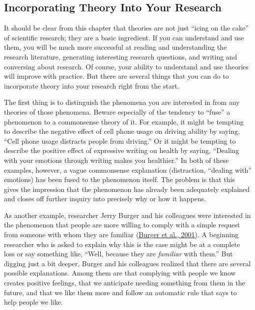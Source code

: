 \documentclass[
]{krantz}
\begin{document}
\hypertarget{incorporating-theory-into-your-research}{%
\subsection*{Incorporating Theory Into Your Research}\label{incorporating-theory-into-your-research}}


It should be clear from this chapter that theories are not just ``icing on the cake'' of scientific research; they are a basic ingredient. If you can understand and use them, you will be much more successful at reading and understanding the research literature, generating interesting research questions, and writing and conversing about research. Of course, your ability to understand and use theories will improve with practice. But there are several things that you can do to incorporate theory into your research right from the start.

The first thing is to distinguish the phenomena you are interested in from any theories of those phenomena. Beware especially of the tendency to ``fuse'' a phenomenon to a commonsense theory of it. For example, it might be tempting to describe the negative effect of cell phone usage on driving ability by saying, ``Cell phone usage distracts people from driving.'' Or it might be tempting to describe the positive effect of expressive writing on health by saying, ``Dealing with your emotions through writing makes you healthier.'' In both of these examples, however, a vague commonsense explanation (distraction, ``dealing with'' emotions) has been fused to the phenomenon itself. The problem is that this gives the impression that the phenomenon has already been adequately explained and closes off further inquiry into precisely why or how it happens.

As another example, researcher Jerry Burger and his colleagues were interested in the phenomenon that people are more willing to comply with a simple request from someone with whom they are familiar (\protect\hyperlink{ref-burger2001effect}{Burger et al., 2001}). A beginning researcher who is asked to explain why this is the case might be at a complete loss or say something like, ``Well, because they are \emph{familiar} with them.'' But digging just a bit deeper, Burger and his colleagues realized that there are several possible explanations. Among them are that complying with people we know creates positive feelings, that we anticipate needing something from them in the future, and that we like them more and follow an automatic rule that says to help people we like.
\end{document}
